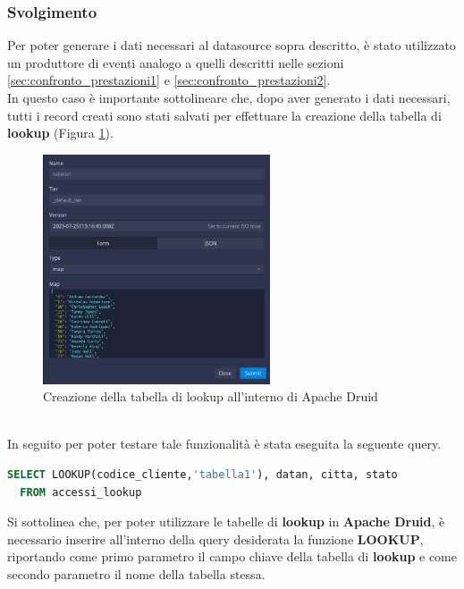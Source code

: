 \subsubsection{Svolgimento}
Per poter generare i dati necessari al \gls{datasource}{} sopra descritto, è stato utilizzato un produttore di eventi 
analogo a quelli descritti nelle sezioni \ref{sec:confronto_prestazioni1} e \ref{sec:confronto_prestazioni2}.\\
In questo caso è importante sottolineare che, dopo aver generato i dati necessari, tutti i 
record  creati sono stati salvati per effettuare la creazione della tabella di \textbf{lookup} (Figura \ref{fig:lookup}).\\
\begin{figure}[h]
  \centering
  \includegraphics[width=0.6\textwidth]{images/percorso/inserimento_lookup.png}
  \caption{Creazione della tabella di lookup all'interno di Apache Druid}
  \label{fig:lookup}
\end{figure}
\pagebreak
\\
In seguito per poter testare tale funzionalità è stata eseguita la seguente query.
\begin{lstlisting}[language=SQL]
  SELECT LOOKUP(codice_cliente,'tabella1'), datan, citta, stato
  FROM accessi_lookup
\end{lstlisting}
Si sottolinea che, per poter utilizzare le tabelle di \textbf{lookup} in \textbf{Apache Druid}, 
è necessario
inserire all'interno della query desiderata la funzione \textbf{LOOKUP}, riportando come primo parametro il campo chiave della tabella di \textbf{lookup} e come secondo parametro il nome della tabella stessa.\\
